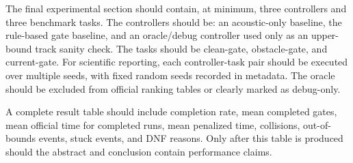 The final experimental section should contain, at minimum, three controllers and three benchmark tasks. The controllers should be: an acoustic-only baseline, the rule-based gate baseline, and an oracle/debug controller used only as an upper-bound track sanity check. The tasks should be clean-gate, obstacle-gate, and current-gate. For scientific reporting, each controller-task pair should be executed over multiple seeds, with fixed random seeds recorded in metadata. The oracle should be excluded from official ranking tables or clearly marked as debug-only.

A complete result table should include completion rate, mean completed gates, mean official time for completed runs, mean penalized time, collisions, out-of-bounds events, stuck events, and DNF reasons. Only after this table is produced should the abstract and conclusion contain performance claims.
